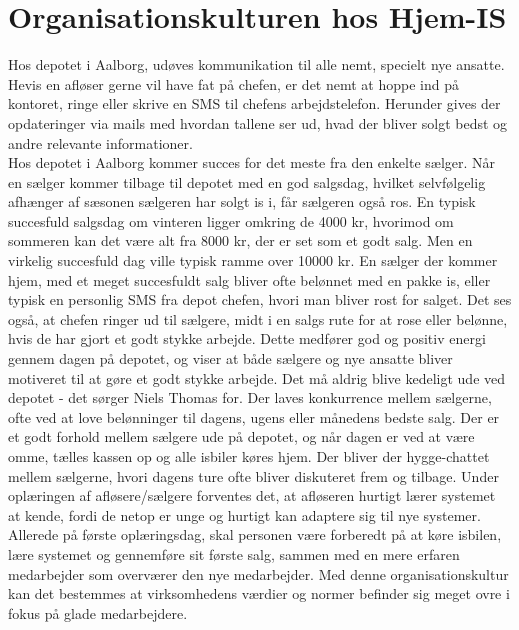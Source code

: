 \section{Organisationskulturen hos Hjem-IS}
Hos depotet i Aalborg, udøves kommunikation til alle nemt, specielt nye ansatte. Hevis en afløser gerne vil have fat på chefen, er det nemt at hoppe ind på kontoret, ringe eller skrive en SMS til chefens arbejdstelefon. Herunder gives der opdateringer via mails med hvordan tallene ser ud, hvad der bliver solgt bedst og andre relevante informationer. \\
Hos depotet i Aalborg kommer succes for det meste fra den enkelte sælger. Når en sælger kommer tilbage til depotet med en god salgsdag, hvilket selvfølgelig afhænger af sæsonen sælgeren har solgt is i, får sælgeren også ros. En typisk succesfuld salgsdag om vinteren ligger omkring de 4000 kr, hvorimod om sommeren kan det være alt fra 8000 kr, der er set som et godt salg. Men en virkelig succesfuld dag ville typisk ramme over 10000 kr. En sælger der kommer hjem, med et meget succesfuldt salg bliver ofte belønnet med en pakke is, eller typisk en personlig SMS fra depot chefen, hvori man bliver rost for salget. Det ses også, at chefen ringer ud til sælgere, midt i en salgs rute for at rose eller belønne, hvis de har gjort et godt stykke arbejde. Dette medfører god og positiv energi gennem dagen på depotet, og viser at både sælgere og nye ansatte bliver motiveret til at gøre et godt stykke arbejde. 
Det må aldrig blive kedeligt ude ved depotet - det sørger Niels Thomas for. Der laves konkurrence mellem sælgerne, ofte ved at love belønninger til dagens, ugens eller månedens bedste salg. Der er et godt forhold mellem sælgere ude på depotet, og når dagen er ved at være omme, tælles kassen op og alle isbiler køres hjem. Der bliver der hygge-chattet mellem sælgerne, hvori dagens ture ofte bliver diskuteret frem og tilbage. Under oplæringen af afløsere/sælgere forventes det, at afløseren hurtigt lærer systemet at kende, fordi de netop er unge og hurtigt kan adaptere sig til nye systemer. Allerede på første oplæringsdag, skal personen være forberedt på at køre isbilen, lære systemet og gennemføre sit første salg, sammen med en mere erfaren medarbejder som overværer den nye medarbejder. Med denne organisationskultur kan det bestemmes at virksomhedens værdier og normer befinder sig meget ovre i fokus på glade medarbejdere.

